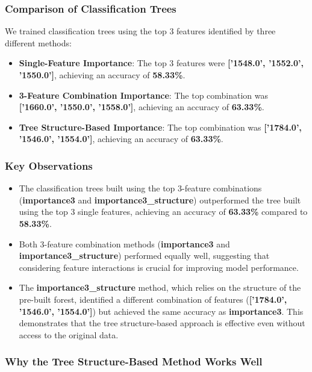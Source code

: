 \documentclass[fleqn,moreauthors,10pt]{ds_report}
\begin{document}
\subsubsection*{Comparison of Classification Trees}
We trained classification trees using the top 3 features identified by three different methods:
\begin{itemize}
    \item \textbf{Single-Feature Importance}: The top 3 features were \textbf{['1548.0', '1552.0', '1550.0']}, achieving an accuracy of \textbf{58.33\%}.
    \item \textbf{3-Feature Combination Importance}: The top combination was \textbf{['1660.0', '1550.0', '1558.0']}, achieving an accuracy of \textbf{63.33\%}.
    \item \textbf{Tree Structure-Based Importance}: The top combination was \textbf{['1784.0', '1546.0', '1554.0']}, achieving an accuracy of \textbf{63.33\%}.
\end{itemize}

\subsubsection*{Key Observations}
\begin{itemize}
    \item The classification trees built using the top 3-feature combinations (\textbf{importance3} and \textbf{importance3\_structure}) outperformed the tree built using the top 3 single features, achieving an accuracy of \textbf{63.33\%} compared to \textbf{58.33\%}.
    \item Both 3-feature combination methods (\textbf{importance3} and \textbf{importance3\_structure}) performed equally well, suggesting that considering feature interactions is crucial for improving model performance.
    \item The \textbf{importance3\_structure} method, which relies on the structure of the pre-built forest, identified a different combination of features (\textbf{['1784.0', '1546.0', '1554.0']}) but achieved the same accuracy as \textbf{importance3}. This demonstrates that the tree structure-based approach is effective even without access to the original data.
\end{itemize}

\subsubsection*{Why the Tree Structure-Based Method Works Well}
\end{document}
